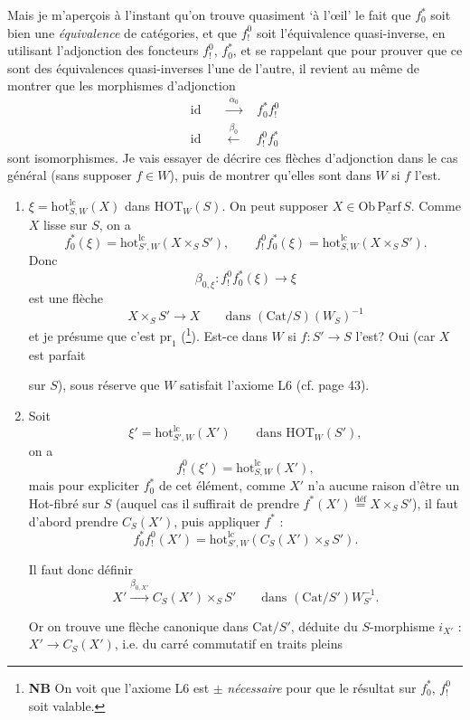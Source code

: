 \documentclass[11pt]{article}
\newcommand{\printedpage}[1]{\marginpar{\footnotesize p.~#1}}
\newcommand{\msp}[1]{\marginpar{\footnotesize [#1]}}
\newcommand{\hot}{\mathrm{hot}}
\newcommand{\HOT}{\mathrm{HOT}}
\newcommand{\Cat}{\mathrm{Cat}}
\begin{document}
\printedpage{98}
\msp{160}
Mais je m'aperçois à l'instant qu'on trouve quasiment ‘à l'œil’ le fait que $f_0^*$ soit bien une \textit{équivalence} de catégories, et que $f_!^0$ soit l'équivalence quasi-inverse, en utilisant l'adjonction des foncteurs $f_!^0$, $f_0^*$, et se rappelant que pour prouver que ce sont des équivalences quasi-inverses l'une de l'autre, il revient au même de montrer que les morphismes d'adjonction
\[\begin{aligned}
\mathrm{id}&\quad\xrightarrow{\ \alpha_0\ }\quad f_0^*f_!^0\\
\mathrm{id}&\quad\xleftarrow{\ \beta_0\ }\quad f_!^0f_0^*
\end{aligned}\]
sont isomorphismes. Je vais essayer de décrire ces flèches d'adjonction dans le cas général (sans supposer $f\in W$), puis de montrer qu'elles sont dans $W$ si $f$ l'est.

\begin{enumerate}
\item[] $\xi=\hot^{\mathrm{lc}}_{S,W}(X)$ dans $\HOT_W(S)$. On peut supposer $X\in\mathrm{Ob}\,\underline{\mathrm{Parf}}\,S$. Comme $X$ lisse sur $S$, on a
\[f_0^*(\xi)=\hot^{\mathrm{lc}}_{S',W}(X\times_S S'),\qquad f_!^0f_0^*(\xi)=\hot^{\mathrm{lc}}_{S,W}(X\times_S S').\]
Donc
\[\beta_{0,\xi} : f_!^0f_0^*(\xi)\longrightarrow\xi\]
est une flèche
\[X\times_S S'\longrightarrow X\qquad\text{dans }(\Cat/S)(W_S)^{-1}\]
et je présume que c'est $\mathrm{pr}_1$ (\footnote[78]{\textbf{NB} On voit que l'axiome L6 est $\pm$ \textit{nécessaire} pour que le résultat sur $f_0^*$, $f_!^0$ soit valable.}). Est-ce dans $W$ si $f : S'\longrightarrow S$ l'est? Oui (car $X$ est parfait

\msp{161}

sur $S$), sous réserve que $W$ satisfait l'axiome L6 (cf. page 43).

\item[2)] Soit
\[\xi'=\hot^{\mathrm{lc}}_{S',W}(X')\qquad\text{dans }\HOT_W(S'),\]
on a
\[f_!^0(\xi')=\hot^{\mathrm{lc}}_{S,W}(X'),\]
mais pour expliciter $f_0^*$ de cet élément, comme $X'$ n'a aucune raison d'être un Hot-fibré sur $S$ (auquel cas il suffirait de prendre $f^*(X')\overset{\text{déf}}{=}X\times_S S'$), il faut d'abord prendre $C_S(X')$, puis appliquer $f^*$ :
\[f_0^*f_!^0(X')=\hot^{\mathrm{lc}}_{S',W}(C_S(X')\times_S S').\]

Il faut donc définir
\[X'\xrightarrow{\beta_{0,X'}}C_S(X')\times_S S'\qquad\text{dans }(\Cat/S')W_{S'}^{-1}.\]

Or on trouve une flèche canonique dans $\Cat/S'$, déduite du $S$-morphisme $i_{X'}$ : $X'\longrightarrow C_S(X')$, i.e. du carré commutatif en traits pleins
\end{enumerate}
\end{document}
